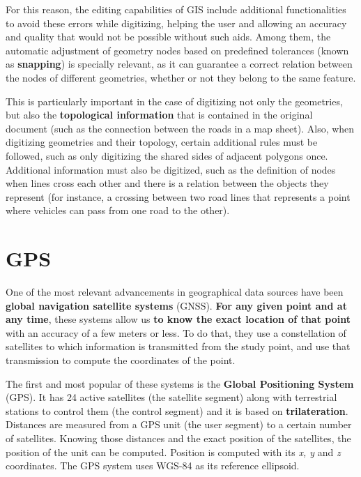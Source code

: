 For this reason, the editing capabilities of GIS include additional functionalities to avoid these errors while digitizing, helping the user and allowing an accuracy and quality that would not be possible without such aids. Among them, the automatic adjustment of geometry nodes based on predefined tolerances (known as \textbf{snapping}) is specially relevant, as it can guarantee a correct relation between the nodes of different geometries, whether or not they belong to the same feature.

This is particularly important in the case of digitizing not only the geometries, but also the \textbf{topological information} that is contained in the original document (such as the connection between the roads in a map sheet). Also, when digitizing geometries and their topology, certain additional rules must be followed, such as only digitizing the shared sides of adjacent polygons once. Additional information must also be digitized, such as the definition of nodes when lines cross each other and there is a relation between the objects they represent (for instance, a crossing between two road lines that represents a point where vehicles can pass from one road to the other).

\section{GPS}

One of the most relevant advancements in geographical data sources have been \textbf{global navigation satellite systems} (GNSS). \textbf{For any given point and at any time}, these systems allow us \textbf{to know the exact location of that point} with an accuracy of a few meters or less. To do that, they use a constellation of satellites to which information is transmitted from the study point, and use that transmission to compute the coordinates of the point.

The first and most popular of these systems is the \textbf{Global Positioning System} (GPS). It has 24 active satellites (the satellite segment) along with terrestrial stations to control them (the control segment) and it is based on \textbf{trilateration}. Distances are measured from a GPS unit (the user segment) to a certain number of satellites. Knowing those distances and the exact position of the satellites, the position of the unit can be computed. Position is computed with its \emph{x, y} and \emph{z} coordinates. The GPS system uses WGS-84 as its reference ellipsoid.

